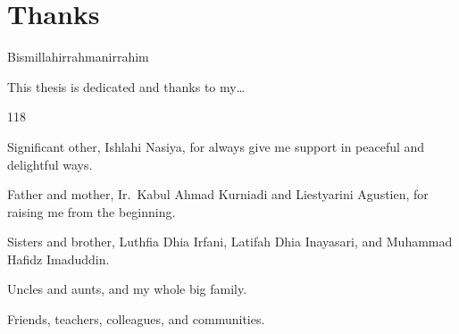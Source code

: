 
\begingroup
\let\clearpage\relax
\let\cleardoublepage\relax

\chapter*{Thanks}
\label{chap:thanks}

Bismillahirrahmanirrahim

\noindent This thesis is dedicated and thanks to my\ldots

\hfill

\begin{dinglist}{118}
\item Significant other, Ishlahi Nasiya, for always give me support in peaceful and delightful ways.
\item Father and mother, Ir.\ Kabul Ahmad Kurniadi and Liestyarini Agustien, for raising me from the beginning.
\item Sisters and brother, Luthfia Dhia Irfani, Latifah Dhia Inayasari, and Muhammad Hafidz Imaduddin.
\item Uncles and aunts, and my whole big family.
\item Friends, teachers, colleagues, and communities.
\end{dinglist}

\endgroup

